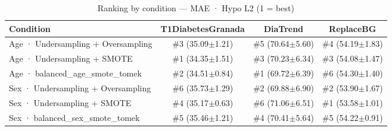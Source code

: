 \begin{table}[htbp]
\centering
\small
\caption{Ranking by condition — MAE · Hypo L2  (1 = best)}
\label{tab:ranking_mae_tbr_2_family_size_same_size}
\begin{tabular}{lccc}
\toprule
\textbf{Condition} & \textbf{T1DiabetesGranada} & \textbf{DiaTrend} & \textbf{ReplaceBG} \\
\midrule
Age · Undersampling + Oversampling & \#3 (35.09$\pm$1.21) & \#5 (70.64$\pm$5.60) & \#4 (54.19$\pm$1.83) \\
Age · Undersampling + SMOTE & \#1 (34.35$\pm$1.51) & \#3 (70.23$\pm$6.34) & \#3 (54.08$\pm$1.47) \\
Age · balanced_age_smote_tomek & \#2 (34.51$\pm$0.84) & \#1 (69.72$\pm$6.39) & \#6 (54.30$\pm$1.40) \\
\midrule
Sex · Undersampling + Oversampling & \#6 (35.73$\pm$1.29) & \#2 (69.88$\pm$6.90) & \#2 (53.90$\pm$1.67) \\
Sex · Undersampling + SMOTE & \#4 (35.17$\pm$0.63) & \#6 (71.06$\pm$6.51) & \#1 (53.58$\pm$1.01) \\
Sex · balanced_sex_smote_tomek & \#5 (35.46$\pm$1.21) & \#4 (70.41$\pm$5.64) & \#5 (54.22$\pm$0.91) \\
\bottomrule
\end{tabular}
\end{table}